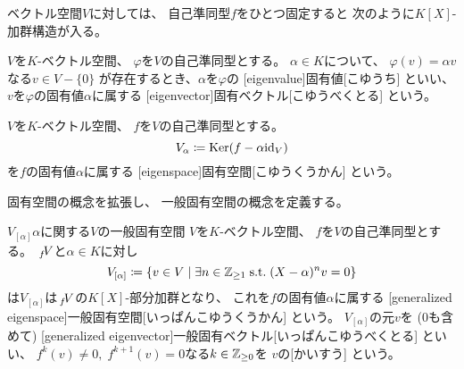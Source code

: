 \documentclass[report]{jlreq}
\begin{document}
ベクトル空間$V$に対しては、
自己準同型$f$をひとつ固定すると
次のように$K[X]$-加群構造が入る。


\begin{definition}[固有値と固有ベクトル]
    $V$を$K$-ベクトル空間、
    $\varphi$を$V$の自己準同型とする。
    $\alpha \in K$について、
    $\varphi(v) = \alpha v$なる$v \in V - \{ 0 \}$
    が存在するとき、$\alpha$を$\varphi$の
    [eigenvalue]{固有値}[こゆうち]
    といい、
    $v$を$\varphi$の固有値$\alpha$に属する
    [eigenvector]{固有ベクトル}[こゆうべくとる]
    という。
\end{definition}

\begin{definition}[固有空間]
    $V$を$K$-ベクトル空間、
    $f$を$V$の自己準同型とする。
    \begin{equation}
        V_{\alpha} \coloneqq \operatorname{\mathrm{Ker}} (f - \alpha \mathrm{id}_V)
    \end{equation}
    を$f$の固有値$\alpha$に属する
    [eigenspace]{固有空間}[こゆうくうかん]
    という。
\end{definition}

固有空間の概念を拡張し、
一般固有空間の概念を定義する。

\begin{definition}[一般固有空間]
        {$V_{[\alpha]}$}{$\alpha$に関する$V$の一般固有空間}
    $V$を$K$-ベクトル空間、
    $f$を$V$の自己準同型とする。
    $\,{}_{f}\!V$と$\alpha \in K$に対し
    \begin{equation}
        V_{[\alpha]} \coloneqq \{
            v \in V
            \mid
            \exists n \in \mathbb{Z}_{\ge 1}
            \; \text{s.t.} \;
            (X - \alpha)^n v = 0
        \}
    \end{equation}
    は$V_{[\alpha]}$は$\,{}_{f}\!V$の$K[X]$-部分加群となり、
    これを$f$の固有値$\alpha$に属する
    [generalized eigenspace]{一般固有空間}[いっぱんこゆうくうかん]
    という。
    $V_{[\alpha]}$の元$v$を ($0$も含めて)
    [generalized eigenvector]{一般固有ベクトル}[いっぱんこゆうべくとる]
    といい、
    $f^k(v) \neq 0, \; f^{k + 1}(v) = 0$なる$k \in \mathbb{Z}_{\ge 0}$を
    $v$の[かいすう]
    という。
\end{definition}
\end{document}

